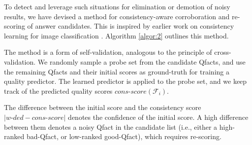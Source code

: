To detect and leverage such situations for
elimination or demotion of noisy results, 
we have devised a method for
consistency-aware corroboration and re-scoring
of answer candidates.
This is inspired by earlier work on consistency learning
for image classification 
\cite{DBLP:conf/mir/YagnikI07}. 
Algorithm \ref{algor:2} 
outlines this method.



The method is a form of self-validation,
analogous to
the principle of cross-validation.
We randomly sample a probe set from the candidate Qfacts, and use the remaining Qfacts and their initial scores
as ground-truth for training a quality predictor.
The learned predictor is applied to the probe set,
and we keep track of the predicted quality scores
$\textit{cons-score}(\mathcal{F}_i)$.
\begin{comment}
{\color{blue}
This sampling and cross-validation step is repeated
many times
to ensure that the consistency
score is not computed from a biased set of ground data.
}
\end{comment}

The difference between the initial score and the consistency score 
$|\textit{w-ded} - \textit{cons-score}|$ 
denotes the confidence of the initial score. A high difference between them denotes a noisy Qfact in the candidate list (i.e., either a high-ranked bad-Qfact, or low-ranked good-Qfact), which requires re-scoring. 

